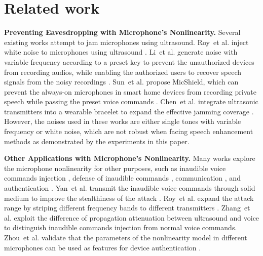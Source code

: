 \section{Related work}
\label{sec:related_work}

\textbf{Preventing Eavesdropping with Microphone's Nonlinearity. }
Several existing works attempt to jam microphones using ultrasound. Roy~et al. inject white noise to microphones using ultrasound \cite{backdoor}. Li~et al. generate noise with variable frequency according to a preset key to prevent the unauthorized devices from recording audios, while enabling the authorized users to recover speech signals from the noisy recordings \cite{patronus}. Sun~et al. propose MicShield, which can prevent the always-on microphones in smart home devices from recording private speech while passing the preset voice commands \cite{sun_alexa_2020}. Chen~et al. integrate ultrasonic transmitters into a wearable bracelet to expand the effective jamming coverage \cite{CHI}. However, the noises used in these works are either single tones with variable frequency or white noise, which are not robust when facing speech enhancement methods as demonstrated by the experiments in this paper.


\textbf{Other Applications with Microphone's Nonlinearity. }
Many works explore the microphone nonlinearity for other purposes, such as inaudible voice commands injection \cite{10.1145/3133956.3134052, 211283, yan_surfingattack_2020}, defense of inaudible commands \cite{he_canceling_2019, Zhang2021EarArrayDA, 211283}, communication \cite{backdoor}, and authentication \cite{zhou_nauth_2019}. Yan~et al. transmit the inaudible voice commands through solid medium to improve the stealthiness of the attack \cite{yan_surfingattack_2020}. Roy~et al. expand the attack range by striping different frequency bands to different transmitters \cite{211283}. Zhang~et al. exploit the difference of propagation attenuation between ultrasound and voice to distinguish inaudible commands injection from normal voice commands. Zhou~et al. validate that the parameters of the nonlinearity model in different microphones can be used as features for device authentication \cite{zhou_nauth_2019}.